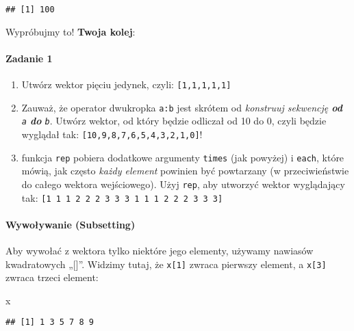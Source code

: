 \documentclass[
]{article}
\newenvironment{Shaded}{\begin{snugshade}}{\end{snugshade}}
\newcommand{\NormalTok}[1]{#1}
\providecommand{\tightlist}{%
  \setlength{\itemsep}{0pt}\setlength{\parskip}{0pt}}
\begin{document}
\begin{verbatim}
## [1] 100
\end{verbatim}

\begin{warning}
Wypróbujmy to! \textbf{Twoja kolej}:
\end{warning}

\hypertarget{zadanie-1}{%
\paragraph{Zadanie 1}\label{zadanie-1}}

\begin{enumerate}
\def\labelenumi{\arabic{enumi}.}
\tightlist
\item
  Utwórz wektor pięciu jedynek, czyli: \texttt{{[}1,1,1,1,1{]}}
\item
  Zauważ, że operator dwukropka \texttt{a:b} jest skrótem od
  \emph{konstruuj sekwencję \textbf{od} \texttt{a} \textbf{do}
  \texttt{b}}. Utwórz wektor, od który będzie odliczał od 10 do 0, czyli
  będzie wyglądał tak: \texttt{{[}10,9,8,7,6,5,4,3,2,1,0{]}}!
\item
  funkcja \texttt{rep} pobiera dodatkowe argumenty \texttt{times} (jak
  powyżej) i \texttt{each}, które mówią, jak często \emph{każdy element}
  powinien być powtarzany (w przeciwieństwie do całego wektora
  wejściowego). Użyj \texttt{rep}, aby utworzyć wektor wyglądający tak:
  \texttt{{[}1\ 1\ 1\ 2\ 2\ 2\ 3\ 3\ 3\ 1\ 1\ 1\ 2\ 2\ 2\ 3\ 3\ 3{]}}
\end{enumerate}

\hypertarget{wywoux142ywanie-subsetting}{%
\paragraph{Wywoływanie (Subsetting)}\label{wywoux142ywanie-subsetting}}

Aby wywołać z wektora tylko niektóre jego elementy, używamy nawiasów
kwadratowych „{[}{]}''. Widzimy tutaj, że \texttt{x{[}1{]}} zwraca
pierwszy element, a \texttt{x{[}3{]}} zwraca trzeci element:

\begin{Shaded}
\begin{Highlighting}[]
\NormalTok{x}
\end{Highlighting}
\end{Shaded}

\begin{verbatim}
## [1] 1 3 5 7 8 9
\end{verbatim}
\end{document}
